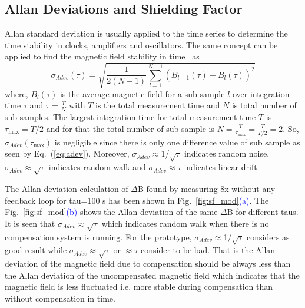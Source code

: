  \subsection{Allan Deviations and Shielding Factor}
 
Allan standard deviation \cite{allan} is usually applied to the time series to determine the time stability in clocks, amplifiers and oscillators. The same concept can be applied to find the magnetic field stability in time~\cite{bea} as
\begin{equation}\label{eq:adev}
    \sigma_{Adev} (\tau)=\sqrt{\frac{1}{2(N-1)}\sum_{l=1}^{N-1} \left(B_{l+1}(\tau)-B_l(\tau)\right)^2}
\end{equation}
where, $B_l(\tau)$ is the average magnetic field for a sub sample $l$ over integration time $\tau$ and $\tau = \frac{T}{N}$ with $T$ is the total measurement time and $N$ is total number of sub samples. The largest integration time for total measurement time $T$ is $\tau_{\text{max}}=T/2$ and for that the total number of sub sample is $N = \frac{T}{\tau_{\text{max}}}=\frac{T}{T/2}=2$. So, $\sigma_{Adev}(\tau_{\text{max}})$ is negligible since there is only one difference value of sub sample as seen by Eq.~(\ref{eq:adev}). Moreover, $\sigma_{Adev}\approx$1/$\sqrt{\tau}$ indicates random noise, $\sigma_{Adev}\approx \sqrt{\tau}$ indicates random walk and $\sigma_{Adev}\approx \tau$ indicates linear drift. 

The Allan deviation calculation of $\Delta$B found by measuring 8x without any feedback loop for tau=100 s has been shown in Fig.~\ref{fig:sf_mod}\textcolor{blue}{(a)}. The Fig.~\ref{fig:sf_mod}\textcolor{blue}{(b)} shows the Allan deviation of the same $\Delta$B for different taus.  It is seen that $\sigma_{Adev}\approx \sqrt{\tau}$ which indicates random walk when there is no compensation system is running. For the prototype, $\sigma_{Adev}\approx$1/$\sqrt{\tau}$ considers as good result while $\sigma_{Adev}\approx \sqrt{\tau}$ or $\approx \tau$ consider to be bad. That is the Allan deviation of the magnetic field due to compensation should be always less than the Allan deviation of the uncompensated magnetic field which indicates that the magnetic field is less fluctuated i.e. more stable during compensation than without compensation in time. 

